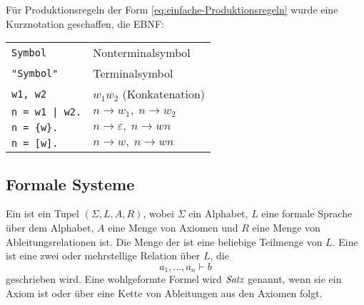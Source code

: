 \noindent
Für Produktionsregeln der Form \eqref{eq:einfache-Produktionsregeln}
wurde eine Kurznotation geschaffen, die EBNF:

\begin{tabular}{l|l}
\verb|Symbol| & Nonterminalsymbol\\
\verb|"Symbol"| & Terminalsymbol\\
\verb|w1, w2| & $w_1w_2$ (Konkatenation)\\
\verb/n = w1 | w2./ & $n\to w_1,\; n\to w_2$\\
\verb|n = {w}.| & $n\to \varepsilon,\; n\to wn$\\
\verb|n = [w].| & $n\to w,\; n\to wn$
\end{tabular}

\subsection{Formale Systeme}
\begin{definition}\mbox{}\newline
Ein  ist ein Tupel $(\Sigma,L,A,R)$, wobei
$\Sigma$ ein Alphabet, $L$ eine formale Sprache über
dem Alphabet, $A$ eine Menge von Axiomen und $R$ eine Menge von
Ableitungsrelationen ist. Die Menge der  ist eine
beliebige Teilmenge von $L$. 
Eine  ist eine zwei oder mehrstellige
Relation über $L$, die
\begin{equation}\label{eq:Ableitungsrelation}
a_1,\ldots,a_n\vdash b
\end{equation}
geschrieben wird. Eine wohlgeformte Formel wird $\textit{Satz}$
genannt, wenn sie ein Axiom ist oder über eine Kette von
Ableitungen aus den Axiomen folgt.
\end{definition}

